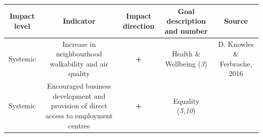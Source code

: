 \documentclass[
]{book}
\begin{document}
\begin{longtable}[]{@{}ccccc@{}}
\toprule
\begin{minipage}[b]{0.17\columnwidth}\centering
Impact level\strut
\end{minipage} & \begin{minipage}[b]{0.16\columnwidth}\centering
Indicator\strut
\end{minipage} & \begin{minipage}[b]{0.17\columnwidth}\centering
Impact direction\strut
\end{minipage} & \begin{minipage}[b]{0.17\columnwidth}\centering
Goal description and number\strut
\end{minipage} & \begin{minipage}[b]{0.17\columnwidth}\centering
Source\strut
\end{minipage}\tabularnewline
\midrule
\endhead
\begin{minipage}[t]{0.17\columnwidth}\centering
Systemic\strut
\end{minipage} & \begin{minipage}[t]{0.16\columnwidth}\centering
Increase in neighbourhood walkability and air quality\strut
\end{minipage} & \begin{minipage}[t]{0.17\columnwidth}\centering
\textbf{+}\strut
\end{minipage} & \begin{minipage}[t]{0.17\columnwidth}\centering
Health \& Wellbeing (\emph{3})\strut
\end{minipage} & \begin{minipage}[t]{0.17\columnwidth}\centering
D. Knowles \& Ferbrache, 2016\strut
\end{minipage}\tabularnewline
\begin{minipage}[t]{0.17\columnwidth}\centering
Systemic\strut
\end{minipage} & \begin{minipage}[t]{0.16\columnwidth}\centering
Encouraged business development and provision of direct access to employment centres\strut
\end{minipage} & \begin{minipage}[t]{0.17\columnwidth}\centering
\textbf{+}\strut
\end{minipage} & \begin{minipage}[t]{0.17\columnwidth}\centering
Equality (\emph{5,10})\strut
\end{minipage} & \begin{minipage}[t]{0.17\columnwidth}\centering

\end{minipage}
\end{longtable}
\end{document}
